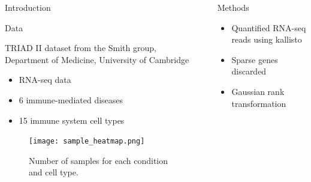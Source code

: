 \documentclass[final]{beamer}
\newlength{\sepwid}
\newlength{\onecolwid}
\begin{document}
\begin{frame}[t]
\begin{columns}[t]
\begin{column}{\onecolwid}
\begin{block}{Introduction}
\end{block}



    



\begin{block}{Data}

TRIAD II dataset from the Smith group, Department of Medicine, University of Cambridge
\begin{itemize}
\setlength{\itemindent}{2em}
\item{RNA-seq data}
\item{6 immune-mediated diseases}
\item{15 immune system cell types}
\end{itemize}

\vspace{20px}
\begin{figure}[h]
\centering
\texttt{[image: sample\_heatmap.png]} 
\caption{Number of samples for each condition and cell type.}
\label{fig:sample_heatmap}
\end{figure}

\end{block}



\end{column} %

\begin{column}{\sepwid}\end{column} %

\begin{column}{\onecolwid} %




\begin{block}{Methods}

\begin{itemize}
\setlength{\itemindent}{2em}
\item{Quantified RNA-seq reads using kallisto \cite{Bray_2016}}
\item{Sparse genes discarded}
\item{Gaussian rank transformation}
\end{itemize}


\end{block}
\end{column}
\end{columns}
\end{frame}
\end{document}
